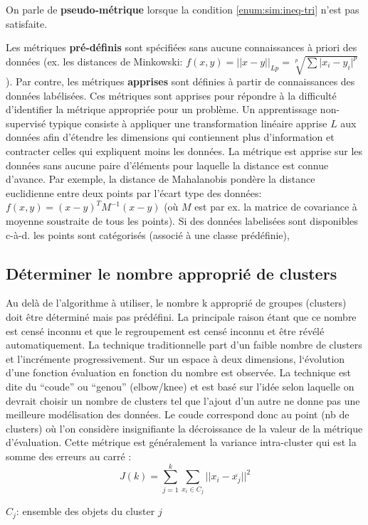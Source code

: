 On parle de \textbf{pseudo-métrique} lorsque la condition \ref{enum:sim:ineq-tri} n'est pas satisfaite.

Les métriques \textbf{pré-définis} sont spécifiées sans aucune connaissances à priori des données (ex. les distances de Minkowski: $f(x,y) = \vert\vert x - y \vert\vert_{Lp} = \sqrt[p]{\sum \vert x_i - y_i \vert ^p}$). Par contre, les métriques \textbf{apprises} sont définies à partir de connaissances des données labélisées. Ces métriques sont apprises pour répondre à la difficulté d'identifier la métrique appropriée pour un problème. Un apprentissage non-supervisé typique consiste à appliquer une transformation linéaire apprise $L$ aux données afin d'étendre les dimensions qui contiennent plus d'information et contracter celles qui expliquent moins les données. La métrique est apprise sur les données sans aucune paire d'éléments pour laquelle la distance est connue d'avance. Par exemple, la distance de Mahalanobis pondère la distance euclidienne entre deux points par l'écart type des données: $f(x,y) = (x-y)^T M^{-1}(x-y)$ (où $M$ est par ex. la matrice de covariance à moyenne soustraite de tous les points). Si des données labelisées sont disponibles c-à-d. les points sont catégorisés (associé à une classe prédéfinie), 


\subsection{Déterminer le nombre approprié de clusters}
    Au delà de l’algorithme à utiliser, le nombre k approprié de groupes (clusters) doit être déterminé mais pas prédéfini. La principale raison étant que ce nombre est censé inconnu et que le regroupement est censé inconnu et être révélé automatiquement.
La technique traditionnelle part d’un faible nombre de clusters et l’incrémente progressivement. Sur un espace à deux dimensions,  l‘évolution d’une fonction évaluation en fonction du nombre est observée.  La technique est dite du “coude” ou “genou” (elbow/knee) et est basé sur l’idée selon laquelle on devrait choisir un nombre de clusters tel que l’ajout d’un autre ne donne pas une meilleure modélisation des données. Le coude correspond donc au point (nb de clusters) où l’on considère insignifiante la décroissance de la valeur de la métrique d’évaluation. Cette métrique est généralement la variance intra-cluster qui est la somme des erreurs au carré  :
\[J(k) = \sum\limits_{j=1}^k\sum\limits_{x_i \in C_j}\vert\vert x_i-\overline{x_j}\vert\vert^2\]

$C_j$: ensemble des objets du cluster $j$

